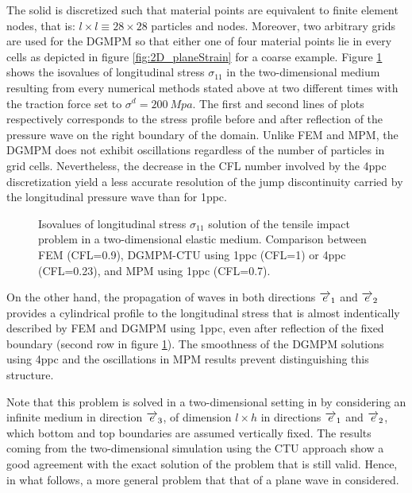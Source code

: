 The solid is discretized such that material points are equivalent to finite element nodes, that is: $l\times l \equiv 28 \times 28$ particles and nodes. Moreover, two arbitrary grids are used for the DGMPM so that either one of four material points lie in every cells as depicted in figure \ref{fig:2D_planeStrain} for a coarse example.
Figure \ref{fig:2delast_comparison} shows the isovalues of longitudinal stress $\sigma_{11}$ in the two-dimensional medium resulting from every numerical methods stated above at two different times with the traction force set to $\sigma^d=200\: Mpa$. The first and second lines of plots respectively corresponds to the stress profile before and after reflection of the pressure wave on the right boundary of the domain.
Unlike FEM and MPM, the DGMPM does not exhibit oscillations regardless of the number of particles in grid cells. Nevertheless, the decrease in the CFL number involved by the 4ppc discretization yield a less accurate resolution of the jump discontinuity carried by the longitudinal pressure wave than for 1ppc.
\begin{figure}[h!]
  \centering
  
  \caption{Isovalues of longitudinal stress $\sigma_{11}$ solution of the tensile impact problem in a two-dimensional elastic medium. Comparison between FEM (CFL=0.9), DGMPM-CTU using 1ppc (CFL=1) or 4ppc (CFL=0.23), and MPM using 1ppc (CFL=0.7).}
  \label{fig:2delast_comparison}
\end{figure}
On the other hand, the propagation of waves in both directions ${\overrightarrow{e}}_1$ and ${\overrightarrow{e}}_2$ provides a cylindrical profile to the longitudinal stress that is almost indentically described by FEM and DGMPM using 1ppc, even after reflection of the fixed boundary (second row in figure \ref{fig:2delast_comparison}). The smoothness of the DGMPM solutions using 4ppc and the oscillations in MPM results prevent distinguishing this structure.

Note that this problem is solved in a two-dimensional setting in \cite{DGMPM} by considering an infinite medium in direction ${\overrightarrow{e}}_3$, of dimension $l\times h$ in directions ${\overrightarrow{e}}_1$ and ${\overrightarrow{e}}_2$, which bottom and top boundaries are assumed vertically fixed.
The results coming from the two-dimensional simulation using the CTU approach show a good agreement with the exact solution of the problem that is still valid. Hence, in what follows, a more general problem that that of a plane wave in considered.



